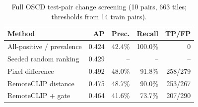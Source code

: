 \begin{table}[t]
\caption{Full OSCD test-pair change screening (10 pairs, 663 tiles; thresholds from 14 train pairs).}
\label{tab:oscd}
\centering
\begin{tabular}{lrrrr}
\hline
Method & AP & Prec. & Recall & TP/FP \\
\hline
All-positive / prevalence & 0.424 & 42.4\% & 100.0\% & 0 \\
Seeded random ranking & 0.429 & -- & -- & -- \\
Pixel difference & 0.492 & 48.0\% & 91.8\% & 258/279 \\
RemoteCLIP distance & 0.475 & 48.7\% & 90.0\% & 253/267 \\
RemoteCLIP + gate & 0.464 & 41.6\% & 73.7\% & 207/290 \\
\hline
\end{tabular}
\end{table}
